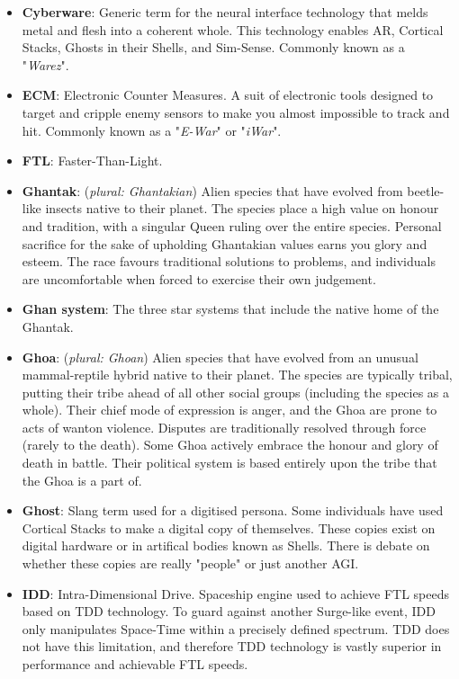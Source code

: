 \documentclass[10pt,twoside]{article}
\begin{document}
\begin{multicols}{2}
\begin{itemize}
    \item \textbf{Cyberware}: Generic term for the neural interface technology that melds metal and flesh into a coherent whole. This technology enables AR, Cortical Stacks, Ghosts in their Shells, and Sim-Sense. Commonly known as a "\textit{Warez}".

    \item \textbf{ECM}: Electronic Counter Measures. A suit of electronic tools designed to target and cripple enemy sensors to make you almost impossible to track and hit. Commonly known as a "\textit{E-War}" or "\textit{iWar}".

    \item \textbf{FTL}: Faster-Than-Light.

    \item \textbf{Ghantak}: (\textit{plural: Ghantakian}) Alien species that have evolved from beetle-like insects native to their planet. The species place a high value on honour and tradition, with a singular Queen ruling over the entire species. Personal sacrifice for the sake of upholding Ghantakian values earns you glory and esteem. The race favours traditional solutions to problems, and individuals are uncomfortable when forced to exercise their own judgement.

    \item \textbf{Ghan system}: The three star systems that include the native home of the Ghantak.

    \item \textbf{Ghoa}: (\textit{plural: Ghoan}) Alien species that have evolved from an unusual mammal-reptile hybrid native to their planet. The species are typically tribal, putting their tribe ahead of all other social groups (including the species as a whole). Their chief mode of expression is anger, and the Ghoa are prone to acts of wanton violence. Disputes are traditionally resolved through force (rarely to the death). Some Ghoa actively embrace the honour and glory of death in battle. Their political system is based entirely upon the tribe that the Ghoa is a part of.

    \item \textbf{Ghost}: Slang term used for a digitised persona. Some individuals have used Cortical Stacks to make a digital copy of themselves. These copies exist on digital hardware or in artifical bodies known as Shells. There is debate on whether these copies are really "people" or just another AGI.

    \item \textbf{IDD}: Intra-Dimensional Drive. Spaceship engine used to achieve FTL speeds based on TDD technology. To guard against another Surge-like event, IDD only manipulates Space-Time within a precisely defined spectrum. TDD does not have this limitation, and therefore TDD technology is vastly superior in performance and achievable FTL speeds.


\end{itemize}
\end{multicols}
\end{document}
